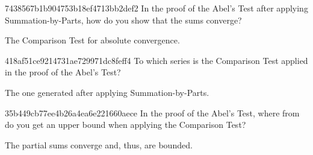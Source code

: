 \begin{note}{7438567b1b904753b18ef4713bb2def2}
    In the proof of the Abel's Test after applying Summation-by-Parts, how do you show that the sums converge?

    \begin{cloze}{1}
        The Comparison Test for absolute convergence.
    \end{cloze}
\end{note}

\begin{note}{418af51ce9214731ae729971dc8feff4}
    To which series is the Comparison Test applied in the proof of the Abel's Test?

    \begin{cloze}{1}
        The one generated after applying Summation-by-Parts.
    \end{cloze}
\end{note}

\begin{note}{35b449cb77ee4b26a4ea6e221660aece}
    In the proof of the Abel's Test, where from do you get an upper bound when applying the Comparison Test?

    \begin{cloze}{1}
        The partial sums converge and, thus, are bounded.
    \end{cloze}
\end{note}


